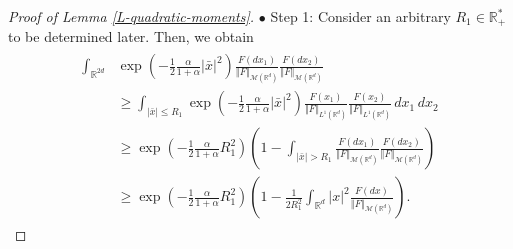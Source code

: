 \documentclass[reqno]{amsart}
\numberwithin{equation}{section}
\begin{document}
{\begin{proof}[Proof of Lemma \ref{L-quadratic-moments}]
$\bullet$ {\sc Step 1}: Consider an arbitrary $R_1\in \mathbb{R}_+^*$ to be determined later. Then, we obtain
\begin{align}\label{E-quadratic-moment-denominator}
\begin{aligned}
\int_{\mathbb{R}^{2d}}&\exp\left(-\frac{1}{2}\frac{\alpha}{1+\alpha}\vert \bar x\vert^2\right)\frac{F(dx_1)}{\Vert F\Vert_{\mathcal{M}(\mathbb{R}^d)}}\frac{F(dx_2)}{\Vert F\Vert_{\mathcal{M}(\mathbb{R}^d)}}\\
&\geq \int_{\vert \bar x\vert\leq R_1}\exp\left(-\frac{1}{2}\frac{\alpha}{1+\alpha}\vert \bar x\vert^2\right)\frac{F(x_1)}{\Vert F\Vert_{L^1(\mathbb{R}^d)}}\frac{F(x_2)}{\Vert F\Vert_{L^1(\mathbb{R}^d)}}\,dx_1\,dx_2\\
&\geq \exp\left(-\frac{1}{2}\frac{\alpha}{1+\alpha}R_1^2\right)\left(1-\int_{\vert \bar x\vert>R_1}\frac{F(dx_1)}{\Vert F\Vert_{\mathcal{M}(\mathbb{R}^d)}}\frac{F(dx_2)}{\Vert F\Vert_{\mathcal{M}(\mathbb{R}^d)}}\right)\\
&\geq \exp\left(-\frac{1}{2}\frac{\alpha}{1+\alpha}R_1^2\right)\left(1-\frac{1}{2R_1^2}\int_{\mathbb{R}^d}\vert x\vert^2\frac{F(dx)}{\Vert F\Vert_{\mathcal{M}(\mathbb{R}^d)}}\right).
\end{aligned}
\end{align}

\medskip


\end{proof}}
\end{document}
